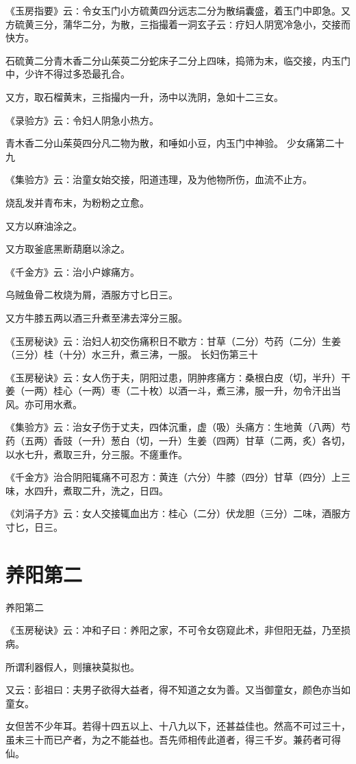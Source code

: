 \documentclass[a4paper,12pt,UTF8,twoside]{ctexbook}
\begin{document}
《玉房指要》云∶令女玉门小方硫黄四分远志二分为散绢囊盛，着玉门中即急。又方硫黄三分，蒲华二分，为散，三指撮着一洞玄子云∶疗妇人阴宽冷急小，交接而快方。

石硫黄二分青木香二分山茱萸二分蛇床子二分上四味，捣筛为末，临交接，内玉门中，少许不得过多恐最孔合。

又方，取石榴黄末，三指撮内一升，汤中以洗阴，急如十二三女。

《录验方》云∶令妇人阴急小热方。

青木香二分山茱萸四分凡二物为散，和唾如小豆，内玉门中神验。
少女痛第二十九

《集验方》云∶治童女始交接，阳道违理，及为他物所伤，血流不止方。

烧乱发并青布末，为粉粉之立愈。

又方以麻油涂之。

又方取釜底黑断葫磨以涂之。

《千金方》云∶治小户嫁痛方。

乌贼鱼骨二枚烧为屑，酒服方寸匕日三。

又方牛膝五两以酒三升煮至沸去滓分三服。

《玉房秘诀》云∶治妇人初交伤痛积日不歇方∶甘草（二分）芍药（二分）生姜（三分）桂（十分）水三升，煮三沸，一服。
长妇伤第三十

《玉房秘诀》云∶女人伤于夫，阴阳过患，阴肿疼痛方∶桑根白皮（切，半升）干姜（一两）桂心（一两）枣（二十枚）以酒一斗，煮三沸，服一升，勿令汗出当风。亦可用水煮。

《集验方》云∶治女子伤于丈夫，四体沉重，虚（吸）头痛方∶生地黄（八两）芍药（五两）香豉（一升）葱白（切，一升）生姜（四两）甘草（二两，炙）各切，以水七升，煮取三升，分三服。不瘥重作。

《千金方》治合阴阳辄痛不可忍方∶黄连（六分）牛膝（四分）甘草（四分）上三味，水四升，煮取二升，洗之，日四。

《刘涓子方》云∶女人交接辄血出方∶桂心（二分）伏龙胆（三分）二味，酒服方寸匕，日三。
\chapter{养阳第二}
养阳第二

《玉房秘诀》云∶冲和子曰∶养阳之家，不可令女窃窥此术，非但阳无益，乃至损病。

所谓利器假人，则攘袂莫拟也。

又云∶彭祖曰∶夫男子欲得大益者，得不知道之女为善。又当御童女，颜色亦当如童女。

女但苦不少年耳。若得十四五以上、十八九以下，还甚益佳也。然高不可过三十，虽未三十而已产者，为之不能益也。吾先师相传此道者，得三千岁。兼药者可得仙。
\end{document}
